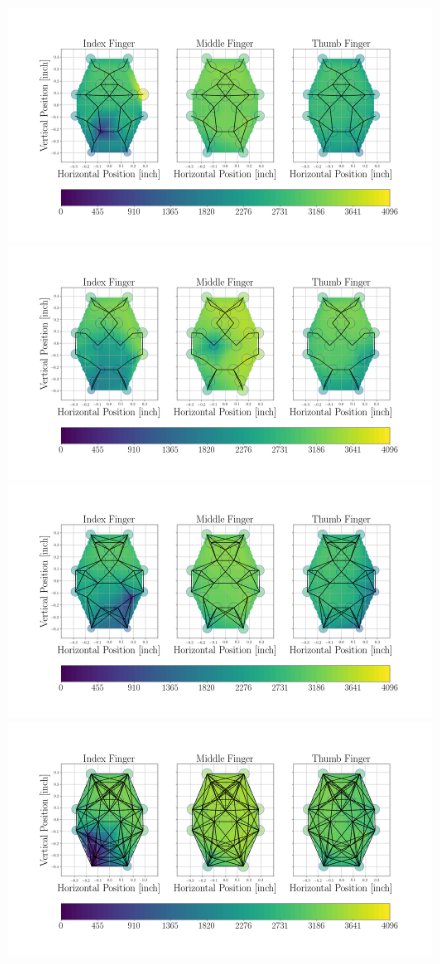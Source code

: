 \begin{figure}[!htb]
    \centering
    \includegraphics[width=\linewidth, clip, trim={90 170 80 50}]{Figures/Tactile/plot-k0.png}
    \bigskip
    \includegraphics[width=\linewidth, clip, trim={90 190 80 50}]{Figures/Tactile/plot-k2.png}
    \bigskip
    \includegraphics[width=\linewidth, clip, trim={90 190 80 50}]{Figures/Tactile/plot-k4.png}
    \bigskip
    \includegraphics[width=\linewidth, clip, trim={90 10 80 50}]{Figures/Tactile/plot-k8.png}

\end{figure}
